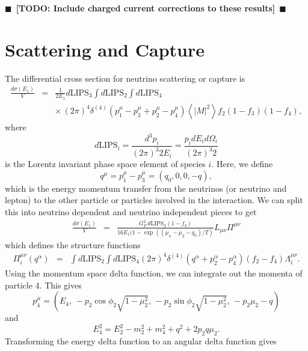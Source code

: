 \documentclass[12pt,letter]{article}
\newcommand{\todo}[1]{{$\blacksquare$~\textbf{\color{blue}[TODO: #1]}}~$\blacksquare$}
\begin{document}
\todo{Include charged current corrections to these results}

\section{Scattering and Capture} 
The differential cross section for neutrino scattering or capture is 
\begin{eqnarray*}
\frac{d \sigma(E_1)}{V} &=& \frac{1}{2 E_1} d\textrm{LIPS}_3 \int d\textrm{LIPS}_2 
\int d\textrm{LIPS}_4 \\
&& \times \, (2 \pi)^4 \delta^{(4)}\left(p^\mu_1 - p^\mu_3 + p^\mu_2 - p^\mu_4 \right)
\left\langle \left| M \right|^2 \right \rangle f_2 (1-f_3) (1-f_4),
\end{eqnarray*}
where 
\begin{equation*}
d\textrm{LIPS}_i = \frac{d^3p_i}{(2\pi)^3 2 E_i} 
= \frac{p_i dE_i d \Omega_i}{(2\pi)^3 2} 
\end{equation*}
is the Lorentz invariant phase space element of species $i$.  Here, we define 
\begin{equation}
q^\mu = p_1^\mu - p_3^\mu=(q_0,0,0,-q),
\end{equation}
which is the energy momentum transfer from the neutrinos (or neutrino and lepton) to the other particle or particles involved in the interaction.  We can split this into neutrino dependent and neutrino independent pieces to get 
\begin{eqnarray*}
\frac{d \sigma(E_1)}{V} 
&=& \frac{G_F^2 \, d\textrm{LIPS}_3 (1-f_3)}
{16 E_1(1 - \exp((\mu_4 - \mu_2 - q_0)/T)} 
 L_{\mu \nu} \Pi^{\mu \nu}
\end{eqnarray*}
which defines the structure functions 
\begin{eqnarray*}
\Pi_{i}^{\mu \nu}(q^\alpha) &=& \int d\textrm{LIPS}_2 \int d\textrm{LIPS}_4
(2 \pi)^4 \delta^{(4)}\left(q^\alpha + p^\alpha_2 - p^\alpha_4 \right) 
(f_2-f_4) \Lambda_i^{\mu \nu}.
\end{eqnarray*} 
Using the momentum space delta function, we can integrate out the momenta of particle 4.  This gives
\begin{equation*}
p^\mu_4 = (E_4, \, 
-p_2 \cos \phi_2 \sqrt{1-\mu_2^2}, \,
-p_2 \sin \phi_2 \sqrt{1-\mu_2^2}, \,
-p_2 \mu_2 - q)
\end{equation*}
and 
\begin{equation*}
E_4^2 = E_2^2 - m_2^2 + m_4^2 + q^2 + 2 p_2 q \mu_2.  
\end{equation*}
Transforming the energy delta function to an angular delta function gives 
\end{document}
